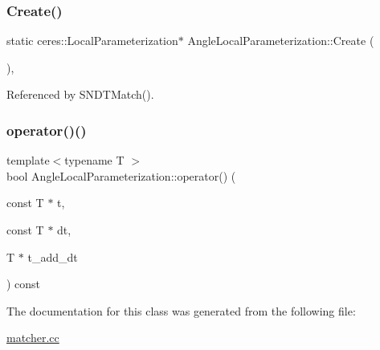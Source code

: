 \subsubsection{\texorpdfstring{Create()}{Create()}}
{\footnotesize\ttfamily static ceres\+::\+Local\+Parameterization$\ast$ Angle\+Local\+Parameterization\+::\+Create (\begin{DoxyParamCaption}{ }\end{DoxyParamCaption})\hspace{0.3cm}{\ttfamily [inline]}, {\ttfamily [static]}}



Referenced by S\+N\+D\+T\+Match().

\mbox{\label{classAngleLocalParameterization_a4395ea0db2ce1f4155d6a75931fcdff1}} 
\subsubsection{\texorpdfstring{operator()()}{operator()()}}
{\footnotesize\ttfamily template$<$typename T $>$ \\
bool Angle\+Local\+Parameterization\+::operator() (\begin{DoxyParamCaption}\item[{const T $\ast$}]{t,  }\item[{const T $\ast$}]{dt,  }\item[{T $\ast$}]{t\+\_\+add\+\_\+dt }\end{DoxyParamCaption}) const\hspace{0.3cm}{\ttfamily [inline]}}



The documentation for this class was generated from the following file\+:\begin{DoxyCompactItemize}
\item 
\hyperlink{matcher_8cc}{matcher.\+cc}\end{DoxyCompactItemize}
